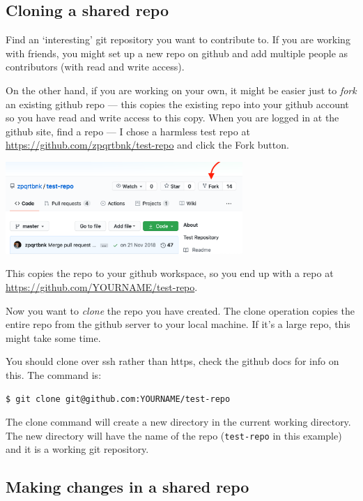 \documentclass{article}
\begin{document}
\subsection*{Cloning a shared repo}

Find an `interesting' git repository you want to contribute to.
If you are working with friends, you might set up a new repo on github and
add multiple people as contributors (with read and write access).

On the other hand, if you are working on your own, it might be easier just
to \emph{fork} an existing github repo --- this copies the existing repo
into your github account so you have read and write access to this copy.
When you are logged in at the github site, find a repo --- I chose a harmless test repo at \url{https://github.com/zpqrtbnk/test-repo} and click the Fork button.

\begin{center}
\includegraphics[width=9cm]{github_fork.png}
\end{center}

This copies the repo to your github workspace, so you end up with a repo at \url{https://github.com/YOURNAME/test-repo}.

Now you want to \emph{clone} the repo you have created. The clone operation copies the entire repo from the github server to your local machine. If it's a large repo, this might take some time.

You should clone over ssh rather than https, check the github docs for info on this. The command is:

\begin{lstlisting}[style=BashInputStyle]
    $ git clone git@github.com:YOURNAME/test-repo
\end{lstlisting}


The clone command will create a new directory in the current working directory.
The new directory will have the name of the repo (\texttt{test-repo} in this example) and it is a working git repository.


\subsection*{Making changes in a shared repo}
\end{document}
